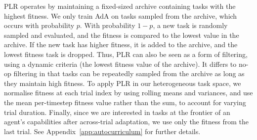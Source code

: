 PLR operates by maintaining a fixed-sized archive containing tasks with the highest fitness. We only train AdA on tasks sampled from the archive, which occurs with probability $p$. With probability $1-p$, a new task is randomly sampled and evaluated, and the fitness is compared to the lowest value in the archive. If the new task has higher fitness, it is added to the archive, and the lowest fitness task is dropped. Thus, PLR can also be seen as a form of filtering, using a dynamic criteria (the lowest fitness value of the archive). It differs to no-op filtering in that tasks can be repeatedly sampled from the archive as long as they maintain high fitness. To apply PLR in our heterogeneous task space, we normalise fitness at each trial index by using rolling means and variances, and use the mean per-timestep fitness value rather than the sum, to account for varying trial duration. Finally, since we are interested in tasks at the frontier of an agent's capabilities after across-trial adaptation, we use only the fitness from the last trial. See Appendix~\ref{app:autocurriculum} for further details.



